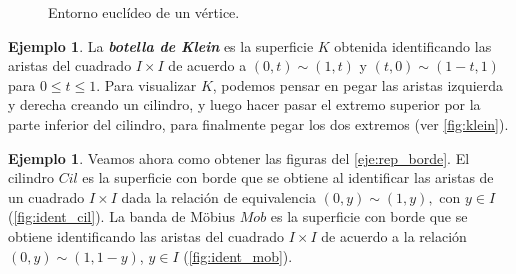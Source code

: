 \documentclass[10pt]{report}
\newcommand{\enfatiza}[1]{\textbf{\textit{#1}}}
\theoremstyle{definition}
\newtheorem{eje}[defin]{Ejemplo}
\begin{document}
\begin{figure}
\caption{Entorno euclídeo de un vértice.\label{fig:6.4}}
\end{figure}





\begin{eje}%
La \enfatiza{botella de Klein} es la superficie $K$ obtenida identificando las aristas del cuadrado $I\times I$ de acuerdo a $(0,t)\sim (1,t)$ y $(t,0)\sim (1-t,1)$ para $0\leq t\leq 1$.  Para visualizar $K$, podemos pensar en pegar las aristas izquierda y derecha creando un cilindro, y luego hacer pasar el extremo superior por la parte inferior del cilindro, para finalmente pegar los dos extremos (ver \autoref{fig:klein}).
\end{eje}

\begin{eje}\label{eje:rep_mobius}
Veamos ahora como obtener las figuras del \autoref{eje:rep_borde}. El cilindro $Cil$ es la superficie con borde que se obtiene al identificar las aristas de un cuadrado $I\times I$ dada la relación de equivalencia $(0,y)\sim (1,y),$ con $y\in I$ (\autoref{fig:ident_cil}). La banda de Möbius $Mob$ es la superficie con borde que se obtiene identificando las aristas del cuadrado $I\times I$ de acuerdo a la relación $(0,y)\sim (1,1-y)$, $y\in I$ (\autoref{fig:ident_mob}).
\end{eje}
\end{document}

